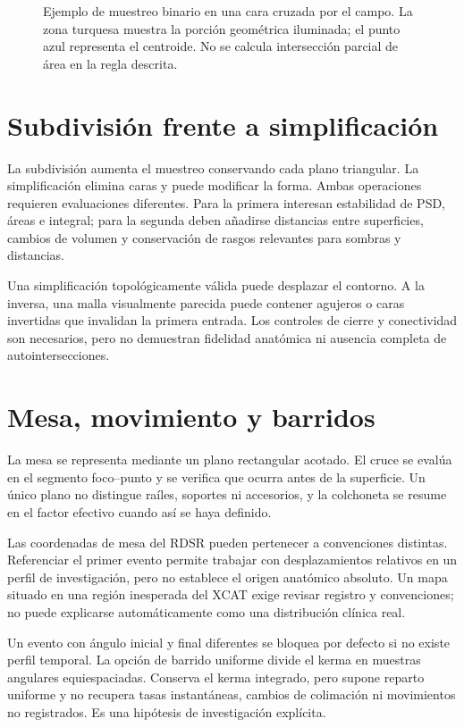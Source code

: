 \begin{figure}[htbp]\centering
\caption{Ejemplo de muestreo binario en una cara cruzada por el campo. La zona turquesa muestra la porción geométrica iluminada; el punto azul representa el centroide. No se calcula intersección parcial de área en la regla descrita.}\label{fig:centroides}\end{figure}

\section{Subdivisión frente a simplificación}
La subdivisión aumenta el muestreo conservando cada plano triangular. La simplificación elimina caras y puede modificar la forma. Ambas operaciones requieren evaluaciones diferentes. Para la primera interesan estabilidad de PSD, áreas e integral; para la segunda deben añadirse distancias entre superficies, cambios de volumen y conservación de rasgos relevantes para sombras y distancias.

Una simplificación topológicamente válida puede desplazar el contorno. A la inversa, una malla visualmente parecida puede contener agujeros o caras invertidas que invalidan la primera entrada. Los controles de cierre y conectividad son necesarios, pero no demuestran fidelidad anatómica ni ausencia completa de autointersecciones.

\section{Mesa, movimiento y barridos}
La mesa se representa mediante un plano rectangular acotado. El cruce se evalúa en el segmento foco--punto y se verifica que ocurra antes de la superficie. Un único plano no distingue raíles, soportes ni accesorios, y la colchoneta se resume en el factor efectivo cuando así se haya definido.

Las coordenadas de mesa del RDSR pueden pertenecer a convenciones distintas. Referenciar el primer evento permite trabajar con desplazamientos relativos en un perfil de investigación, pero no establece el origen anatómico absoluto. Un mapa situado en una región inesperada del XCAT exige revisar registro y convenciones; no puede explicarse automáticamente como una distribución clínica real.

Un evento con ángulo inicial y final diferentes se bloquea por defecto si no existe perfil temporal. La opción de barrido uniforme divide el kerma en muestras angulares equiespaciadas. Conserva el kerma integrado, pero supone reparto uniforme y no recupera tasas instantáneas, cambios de colimación ni movimientos no registrados. Es una hipótesis de investigación explícita.

